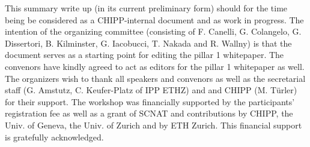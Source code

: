  \noindent This summary write up (in its current preliminary form) should for the time being  be considered as a CHIPP-internal document and as work in progress. The intention of the organizing
 committee (consisting of F. Canelli, G. Colangelo, G. Dissertori, B. Kilminster, G. Iacobucci,  T. Nakada and R. Wallny) is that the document serves as a starting point for editing
 the pillar 1 whitepaper. The convenors have kindly agreed to act as editors for the pillar 1 whitepaper as well.  The organizers wish to thank all speakers and convenors as well as the
 secretarial staff (G. Amstutz, C. Keufer-Platz  of IPP ETHZ) and and CHIPP (M. T\"urler) for their support. The workshop was financially supported by the participants' registration fee as well
 as a grant of SCNAT and contributions by CHIPP,  the Univ. of Geneva, the  Univ. of Zurich and by ETH Zurich. This financial support is gratefully acknowledged.
 
  